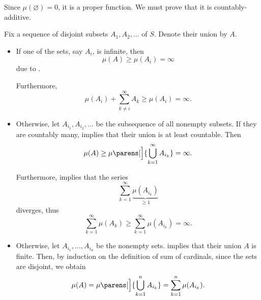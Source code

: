 \begin{defproof}
  Since \( \mu(\varnothing) = 0 \), it is a proper function. We must prove that it is countably-additive.

  Fix a sequence of disjoint subsets \( A_1, A_2, \ldots \) of \( S \). Denote their union by \( A \).

  \begin{itemize}
    \item If one of the sets, say \( A_i \), is infinite, then
    \begin{equation*}
      \mu(A) \geq \mu(A_i) = \infty
    \end{equation*}
    due to .

    Furthermore,
    \begin{equation*}
      \mu(A_i) + \sum_{k \neq i}^\infty A_k \geq \mu(A_i) = \infty.
    \end{equation*}

    \item Otherwise, let \( A_{i_1}, A_{i_2}, \ldots \) be the subsequence of all nonempty subsets. If they are countably many,  implies that their union is at least countable. Then
    \begin{equation*}
      \mu(A) \geq \mu\parens[\Big]{ \bigcup_{k=1}^\infty A_{i_k} } = \infty.
    \end{equation*}

    Furthermore,  implies that the series
    \begin{equation*}
      \sum_{k=1}^\infty \underbrace{\mu(A_{i_k})}_{\geq 1}
    \end{equation*}
    diverges, thus
    \begin{equation*}
      \sum_{k=1}^\infty \mu(A_k) \geq \sum_{k=1}^\infty \mu(A_{i_k}) = \infty.
    \end{equation*}

    \item Otherwise, let \( A_{i_1}, \ldots, A_{i_n} \) be the nonempty sets.  implies that their union \( A \) is finite. Then, by induction on the definition of sum of cardinals, since the sets are disjoint, we obtain
    \begin{equation*}
      \mu(A) = \mu\parens[\Big]{ \bigcup_{k=1}^n A_{i_k} } = \sum_{k=1}^n \mu(A_{i_k}).
    \end{equation*}
  \end{itemize}
\end{defproof}
